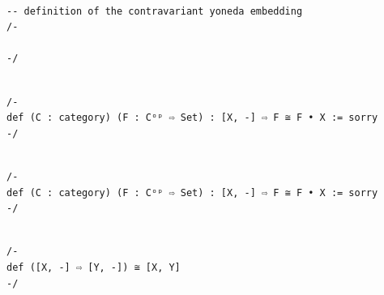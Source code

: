 \documentclass{book}
\newcounter{lcounter}
\begin{document}
\begin{center}
\begin{tcolorbox}[width=5in,colback={white},title={\begin{center}\texttt{Lean \thelcounter} \addtocounter{lcounter}{1}  \end{center}},colbacktitle=Blue,coltitle=black]
\begin{verbatim}

-- definition of the contravariant yoneda embedding
/-

-/

\end{verbatim}%
\end{tcolorbox}
\end{center}


\begin{center}
\begin{tcolorbox}[width=5in,colback={white},title={\begin{center}\texttt{Lean \thelcounter} \addtocounter{lcounter}{1}  \end{center}},colbacktitle=Blue,coltitle=black]
\begin{verbatim}

/-
def (C : category) (F : Cᵒᵖ ⇨ Set) : [X, -] ⇨ F ≅ F • X := sorry
-/

\end{verbatim}%
\end{tcolorbox}
\end{center}


\begin{center}
\begin{tcolorbox}[width=5in,colback={white},title={\begin{center}\texttt{Lean \thelcounter} \addtocounter{lcounter}{1}  \end{center}},colbacktitle=Blue,coltitle=black]
\begin{verbatim}

/-
def (C : category) (F : Cᵒᵖ ⇨ Set) : [X, -] ⇨ F ≅ F • X := sorry
-/

\end{verbatim}%
\end{tcolorbox}
\end{center}



\begin{center}
\begin{tcolorbox}[width=5in,colback={white},title={\begin{center}\texttt{Lean \thelcounter} \addtocounter{lcounter}{1}  \end{center}},colbacktitle=Blue,coltitle=black]
\begin{verbatim}

/-
def ([X, -] ⇨ [Y, -]) ≅ [X, Y]
-/

\end{verbatim}%
\end{tcolorbox}
\end{center}
\end{document}

